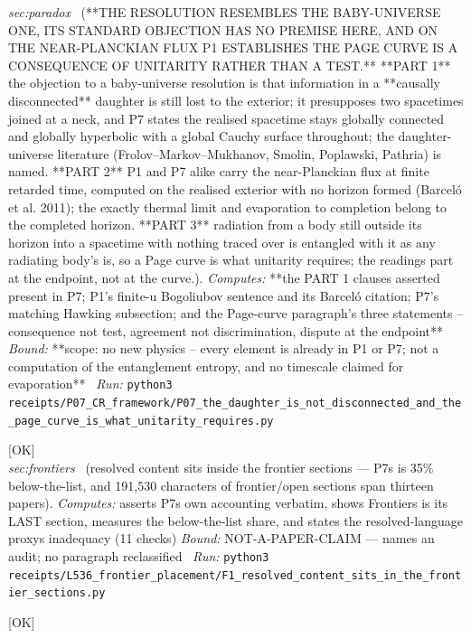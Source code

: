 \begin{description}
\textit{sec:paradox} \ (**THE RESOLUTION RESEMBLES THE BABY-UNIVERSE ONE, ITS STANDARD OBJECTION HAS NO PREMISE HERE, AND ON THE NEAR-PLANCKIAN FLUX P1 ESTABLISHES THE PAGE CURVE IS A CONSEQUENCE OF UNITARITY RATHER THAN A TEST.** **PART 1** the objection to a baby-universe resolution is that information in a **causally disconnected** daughter is still lost to the exterior; it presupposes two spacetimes joined at a neck, and P7 states the realised spacetime stays globally connected and globally hyperbolic with a global Cauchy surface throughout; the daughter-universe literature (Frolov--Markov--Mukhanov, Smolin, Poplawski, Pathria) is named. **PART 2** P1 and P7 alike carry the near-Planckian flux at finite retarded time, computed on the realised exterior with no horizon formed (Barceló et al. 2011); the exactly thermal limit and evaporation to completion belong to the completed horizon. **PART 3** radiation from a body still outside its horizon into a spacetime with nothing traced over is entangled with it as any radiating body's is, so a Page curve is what unitarity requires; the readings part at the endpoint, not at the curve.). 
\emph{Computes:} **the PART 1 clauses asserted present in P7; P1's finite-u Bogoliubov sentence and its Barceló citation; P7's matching Hawking subsection; and the Page-curve paragraph's three statements -- consequence not test, agreement not discrimination, dispute at the endpoint**
 \emph{Bound:} **scope: no new physics -- every element is already in P1 or P7; not a computation of the entanglement entropy, and no timescale claimed for evaporation**
\ \emph{Run:} \texttt{python3 receipts/P07\_CR\_framework/P07\_the\_daughter\_is\_not\_disconnected\_and\_the\_page\_curve\_is\_what\_unitarity\_requires.py}
\item[\label{rcpt:F1_resolved_content_sits_in_the_frontier_sections}\textbf{}\quad\texttt{F1\_resolved\_content\_sits\_in\_the\_frontier\_sections}]\hfill\textsf{[OK]}\\
\textit{sec:frontiers} \ (resolved content sits inside the frontier sections --- P7s is 35\% below-the-list, and 191,530 characters of frontier/open sections span thirteen papers). 
\emph{Computes:} asserts P7s own accounting verbatim, shows Frontiers is its LAST section, measures the below-the-list share, and states the resolved-language proxys inadequacy (11 checks)
 \emph{Bound:} NOT-A-PAPER-CLAIM --- names an audit; no paragraph reclassified
\ \emph{Run:} \texttt{python3 receipts/L536\_frontier\_placement/F1\_resolved\_content\_sits\_in\_the\_frontier\_sections.py}
\item[\label{rcpt:B23_the_corpus_crosses_by_rotation}\textbf{}\quad\texttt{B23\_the\_corpus\_crosses\_by\_rotation}]\hfill\textsf{[OK]}\\

\end{description}
